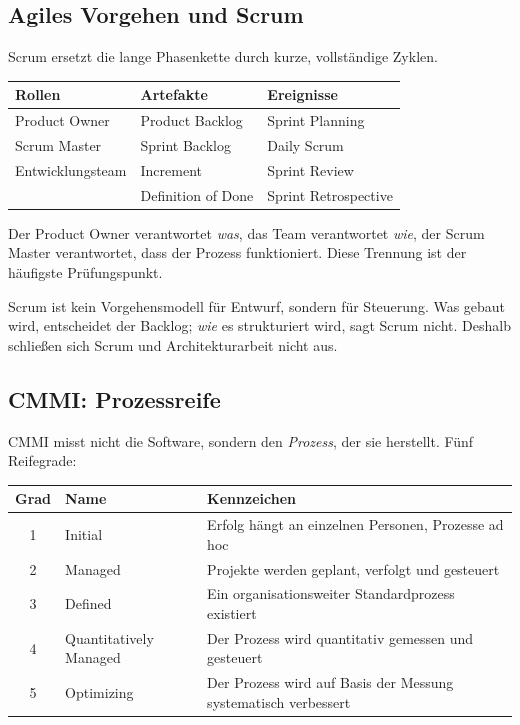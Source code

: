 \documentclass[12pt, a4paper]{article}
\begin{document}
\subsection{Agiles Vorgehen und Scrum}

Scrum ersetzt die lange Phasenkette durch kurze, vollständige Zyklen.

\begin{center}
\begin{tabular}{lll}
\hline
\textbf{Rollen} & \textbf{Artefakte} & \textbf{Ereignisse} \\
\hline
Product Owner & Product Backlog & Sprint Planning \\
Scrum Master  & Sprint Backlog  & Daily Scrum \\
Entwicklungsteam & Increment    & Sprint Review \\
              & Definition of Done & Sprint Retrospective \\
\hline
\end{tabular}
\end{center}

Der Product Owner verantwortet \emph{was}, das Team verantwortet \emph{wie}, der
Scrum Master verantwortet, dass der Prozess funktioniert. Diese Trennung ist der
häufigste Prüfungspunkt.

\begin{notebox}
Scrum ist kein Vorgehensmodell für Entwurf, sondern für Steuerung. Was gebaut wird,
entscheidet der Backlog; \emph{wie} es strukturiert wird, sagt Scrum nicht. Deshalb
schließen sich Scrum und Architekturarbeit nicht aus.
\end{notebox}

\subsection{CMMI: Prozessreife}

CMMI misst nicht die Software, sondern den \emph{Prozess}, der sie herstellt. Fünf
Reifegrade:

\begin{center}
\begin{tabular}{clp{7.4cm}}
\hline
\textbf{Grad} & \textbf{Name} & \textbf{Kennzeichen} \\
\hline
1 & Initial     & Erfolg hängt an einzelnen Personen, Prozesse ad hoc \\
2 & Managed     & Projekte werden geplant, verfolgt und gesteuert \\
3 & Defined     & Ein organisationsweiter Standardprozess existiert \\
4 & Quantitatively Managed & Der Prozess wird quantitativ gemessen und gesteuert \\
5 & Optimizing  & Der Prozess wird auf Basis der Messung systematisch verbessert \\
\hline
\end{tabular}
\end{center}
\end{document}
